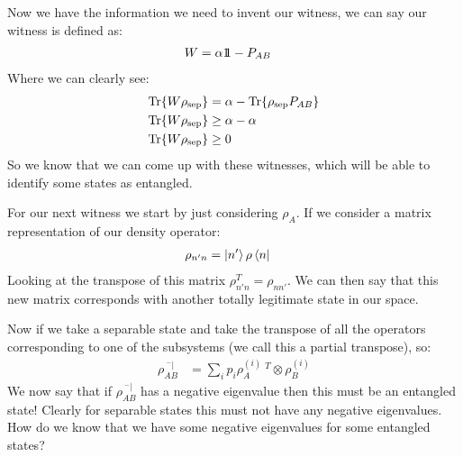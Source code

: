 Now we have the information we need to invent our witness, we can say our witness is defined as:
\begin{align*}
	W &= \alpha 1\!\!1 - P_{AB}
\end{align*}
Where we can clearly see:
\begin{align*}
	\Tr{W\rho_\text{sep}} &= \alpha - \Tr{\rho_\text{sep} P_{AB}} \\
	\Tr{W\rho_\text{sep}} &\geq \alpha - \alpha \\
	\Tr{W\rho_\text{sep}} &\geq 0
\end{align*}
So we know that we can come up with these witnesses, which will be able to identify some states as entangled.

For our next witness we start by just considering $\rho_A$. If we consider a matrix representation of our density operator:
\begin{align*}
	\rho_{n'n} &= \ket{n'}\rho\bra{n}
\end{align*}
Looking at the transpose of this matrix $\rho_{n' n}^T = \rho_{n n'}$. We can then say that this new matrix corresponds with another totally legitimate state in our space.

Now if we take a separable state and take the transpose of all the operators corresponding to one of the subsystems (we call this a partial transpose), so:
\begin{align*}
	\rho_{AB}^{\ ^-|} &= \sum_i p_i\rho_A^{(i)}\ ^T \otimes \rho_B^{(i)}
\end{align*}
We now say that if $\rho_{AB}^{\ ^-|}$ has a negative eigenvalue then this must be an entangled state! Clearly for separable states this must not have any negative eigenvalues.
How do we know that we have some negative eigenvalues for some entangled states?

